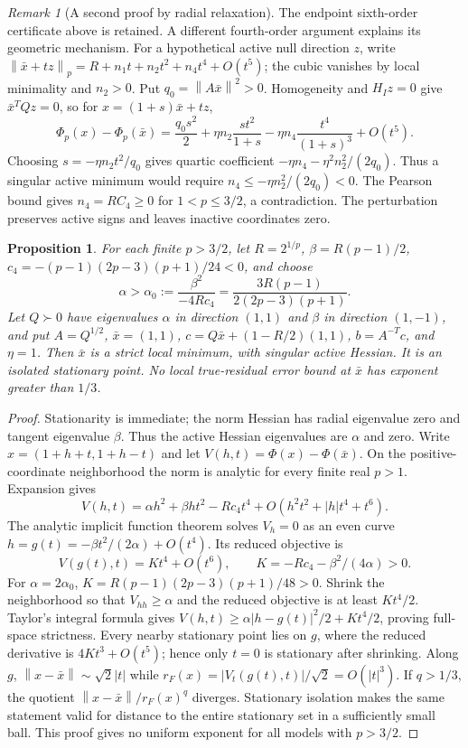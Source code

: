 \documentclass[11pt]{article}
\newcommand{\norm}[1]{\left\lVert#1\right\rVert}
\newtheorem{proposition}[theorem]{Proposition}
\theoremstyle{remark}\newtheorem{remark}[theorem]{Remark}
\begin{document}
\begin{remark}[A second proof by radial relaxation]
The endpoint sixth-order certificate above is retained. A different
fourth-order argument explains its geometric mechanism. For a hypothetical
active null direction $z$, write
$\norm{\bar x+tz}_p=R+n_1t+n_2t^2+n_4t^4+O(t^5)$;
the cubic vanishes by local minimality and $n_2>0$. Put
$q_0=\norm{A\bar x}^2>0$. Homogeneity and $H_Iz=0$ give
$\bar x^TQz=0$, so for $x=(1+s)\bar x+tz$,
\[
 \Phi_p(x)-\Phi_p(\bar x)=\frac{q_0s^2}{2}
 +\eta n_2\frac{st^2}{1+s}
 -\eta n_4\frac{t^4}{(1+s)^3}+O(t^5).
\]
Choosing $s=-\eta n_2t^2/q_0$ gives quartic coefficient
$-\eta n_4-\eta^2n_2^2/(2q_0)$. Thus a singular active minimum would
require $n_4\le-\eta n_2^2/(2q_0)<0$. The Pearson bound gives
$n_4=RC_4\ge0$ for $1<p\le3/2$, a contradiction. The perturbation
preserves active signs and leaves inactive coordinates zero.
\end{remark}

\begin{proposition}\label{prop:sharpfamily}
For each finite $p>3/2$, let $R=2^{1/p}$,
$\beta=R(p-1)/2$, $c_4=-(p-1)(2p-3)(p+1)/24<0$, and choose
\[
 \alpha>\alpha_0:=\frac{\beta^2}{-4Rc_4}
       =\frac{3R(p-1)}{2(2p-3)(p+1)}.
\]
Let $Q\succ0$ have eigenvalues $\alpha$ in direction $(1,1)$ and
$\beta$ in direction $(1,-1)$, and put
$A=Q^{1/2}$, $\bar x=(1,1)$,
$c=Q\bar x+(1-R/2)(1,1)$, $b=A^{-T}c$, and $\eta=1$.
Then $\bar x$ is a strict local minimum, with singular active Hessian.
It is an isolated stationary point. No local true-residual error bound
at $\bar x$ has exponent greater than $1/3$.
\end{proposition}
\begin{proof}
Stationarity is immediate; the norm Hessian has radial eigenvalue zero
and tangent eigenvalue $\beta$. Thus the active Hessian eigenvalues are
$\alpha$ and zero. Write $x=(1+h+t,1+h-t)$ and let
$V(h,t)=\Phi(x)-\Phi(\bar x)$. On the positive-coordinate
neighborhood the norm is analytic for every finite real $p>1$. Expansion gives
\begin{equation}\label{eq:generalquartic}
 V(h,t)=\alpha h^2+\beta ht^2-Rc_4t^4+
            O(h^2t^2+|h|t^4+t^6).
\end{equation}
The analytic implicit function theorem solves $V_h=0$ as an even
curve $h=g(t)=-\beta t^2/(2\alpha)+O(t^4)$. Its reduced objective is
\[
 V(g(t),t)=Kt^4+O(t^6),\qquad K=-Rc_4-\beta^2/(4\alpha)>0.
\]
For $\alpha=2\alpha_0$, $K=R(p-1)(2p-3)(p+1)/48>0$.
Shrink the neighborhood so that $V_{hh}\ge\alpha$ and the reduced
objective is at least $Kt^4/2$. Taylor's integral formula gives
$V(h,t)\ge\alpha|h-g(t)|^2/2+Kt^4/2$, proving full-space strictness.
Every nearby stationary point lies on $g$, where the reduced derivative
is $4Kt^3+O(t^5)$; hence only $t=0$ is stationary after shrinking.
Along $g$, $\norm{x-\bar x}\sim\sqrt2|t|$ while
$r_F(x)=|V_t(g(t),t)|/\sqrt2=O(|t|^3)$.
If $q>1/3$, the quotient $\norm{x-\bar x}/r_F(x)^q$ diverges.
Stationary isolation makes the same statement valid for distance to the
entire stationary set in a sufficiently small ball. This proof gives no
uniform exponent for all models with $p>3/2$.
\end{proof}
\end{document}
